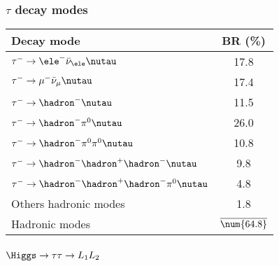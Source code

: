 \begin{frame}
\frametitle{$\tau$ decay modes}%
\begin{center}
\begin{tabular}{lc}
\toprule
Decay mode & BR (\%)\\
\midrule
$\tau^-\to \ele^-\bar{\nu}_\ele\nutau$ & \num{17.8} \\
$\tau^-\to \mu^-\bar{\nu}_\mu\nutau$ & \num{17.4} \\
\midrule
$\tau^-\to \hadron^- \nutau$ & \num{11.5} \\
$\tau^-\to \hadron^- \pi^0 \nutau$ & \num{26.0} \\
$\tau^-\to \hadron^- \pi^0\pi^0 \nutau$ & \num{10.8} \\
$\tau^-\to \hadron^- \hadron^+\hadron^- \nutau$ & \num{9.8} \\
$\tau^-\to \hadron^- \hadron^+\hadron^-\pi^0\nutau$ & \num{4.8} \\
Others hadronic modes & \num{1.8} \\
Hadronic modes & $\overline{\text{\num{64.8}}}$ \\
\bottomrule
\end{tabular}
\end{center}
\end{frame}

\begin{frame}
\frametitle{$\Higgs\to\tau\tau\to L_1L_2$}
\begin{center}

\end{center}
\end{frame}

